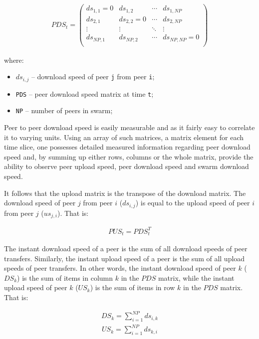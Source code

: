 \begin{align}
  PDS_{t} =
  \begin{pmatrix}
    ds_{1,1} = 0 & ds_{1,2} & \cdots & ds_{1,NP} \\
    ds_{2,1} & ds_{2,2} = 0 & \cdots & ds_{2,NP} \\
    \vdots & \vdots & \ddots & \vdots \\
    ds_{NP,1} & ds_{NP,2} & \cdots & ds_{NP,NP} = 0 \\
  \end{pmatrix}
\end{align}

where:

\begin{itemize}
  \item $ds_{i,j}$ -- download speed of peer \texttt{j} from peer \texttt{i};
  \item \texttt{PDS} -- peer download speed matrix at time \texttt{t};
  \item \texttt{NP} -- number of peers in swarm;
\end{itemize}

Peer to peer download speed is easily measurable and as it fairly easy to
correlate it to varying units. Using an array of such matrices, a matrix
element for each time slice, one possesses detailed measured information
regarding peer download speed and, by summing up either rows, columns or the
whole matrix, provide the ability to observe peer upload speed, peer download
speed and swarm download speed.

It follows that the upload matrix is the transpose of the download matrix. The
download speed of peer $j$ from peer $i$ ($ds_{i,j}$) is equal to the upload
speed of peer $i$ from peer $j$ ($us_{j,i}$). That is:

\begin{align}
  PUS_{t} = PDS_{t}^{T}
\end{align}

The instant download speed of a peer is the sum of all download speeds of peer
transfers. Similarly, the instant upload speed of a peer is the sum of all
upload speeds of peer transfers. In other words, the instant download speed of
peer $k$ ($DS_{k}$) is the sum of items in column $k$ in the $PDS$ matrix,
while the instant upload speed of peer $k$ ($US_{k}$) is the sum of items in
row $k$ in the $PDS$ matrix. That is:

\begin{align}
  DS_{k} = \sum_{i=1}^{NP} ds_{i,k}
\end{align}
\begin{align}
  US_{k} = \sum_{i=1}^{NP} ds_{k,i}
\end{align}

